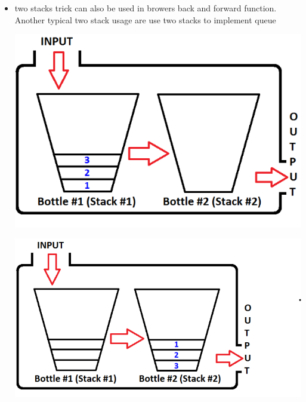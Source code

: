 \documentclass[a4paper,11pt,twoside]{book}
\begin{document}
\begin{itemize}
	\item two stacks trick can also be used in browers back and forward function. Another typical two stack usage are use two stacks to implement queue
	
	\begin{center}
		\includegraphics[scale=0.3]{pics/sq1.png} 
	\end{center}
	\begin{center}
		\includegraphics[scale=0.3]{pics/sq2.png} 
	\end{center}
	

	

\end{itemize}
\end{document}

